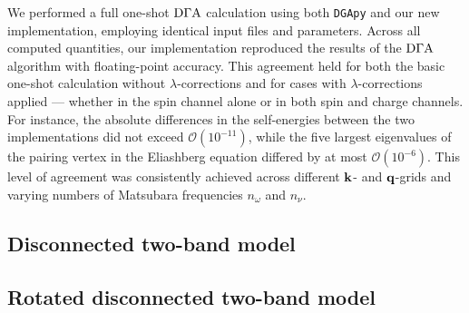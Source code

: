 \documentclass[../../main.tex]{subfiles}
\begin{document}
We performed a full one-shot $\text{D}\Gamma\text{A}$ calculation using both \texttt{DGApy} and our new implementation, employing identical input files and parameters. Across all computed quantities, our implementation reproduced the results of the $\text{D}\Gamma\text{A}$ algorithm with floating-point accuracy. This agreement held for both the basic one-shot calculation without $\lambda$-corrections and for cases with $\lambda$-corrections applied --- whether in the spin channel alone or in both spin and charge channels. For instance, the absolute differences in the self-energies between the two implementations did not exceed $\mathcal{O}(10^{-11})$, while the five largest eigenvalues of the pairing vertex in the Eliashberg equation differed by at most $\mathcal{O}(10^{-6})$. This level of agreement was consistently achieved across different $\textbf{k}$- and $\textbf{q}$-grids and varying numbers of Matsubara frequencies $n_\omega$ and $n_\nu$.

\subsection{Disconnected two-band model}\label{sec:validation_ii}
\subsection{Rotated disconnected two-band model}\label{sec:validation_iii}
\end{document}
